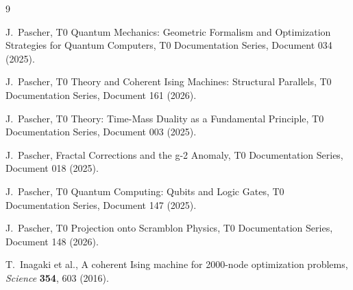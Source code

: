 \begin{thebibliography}{9}

J.~Pascher,
\newblock T0 Quantum Mechanics: Geometric Formalism and Optimization Strategies
for Quantum Computers,
\newblock T0 Documentation Series, Document 034 (2025).

J.~Pascher,
\newblock T0 Theory and Coherent Ising Machines: Structural Parallels,
\newblock T0 Documentation Series, Document 161 (2026).

J.~Pascher,
\newblock T0 Theory: Time-Mass Duality as a Fundamental Principle,
\newblock T0 Documentation Series, Document 003 (2025).

J.~Pascher,
\newblock Fractal Corrections and the g-2 Anomaly,
\newblock T0 Documentation Series, Document 018 (2025).

J.~Pascher,
\newblock T0 Quantum Computing: Qubits and Logic Gates,
\newblock T0 Documentation Series, Document 147 (2025).

J.~Pascher,
\newblock T0 Projection onto Scramblon Physics,
\newblock T0 Documentation Series, Document 148 (2026).

T.~Inagaki et al.,
\newblock A coherent Ising machine for 2000-node optimization problems,
\newblock \emph{Science} \textbf{354}, 603 (2016).

\end{thebibliography}

